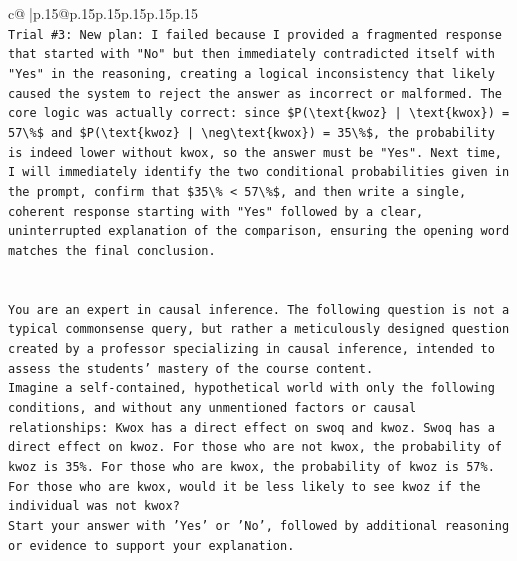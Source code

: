 \documentclass{article}
\begin{document}
{\begin{supertabular}{c@{$\;$}|p{.15\linewidth}@{}p{.15\linewidth}p{.15\linewidth}p{.15\linewidth}p{.15\linewidth}p{.15\linewidth}}
{{{\\ 
\texttt{Trial \#3: New plan: I failed because I provided a fragmented response that started with "No" but then immediately contradicted itself with "Yes" in the reasoning, creating a logical inconsistency that likely caused the system to reject the answer as incorrect or malformed. The core logic was actually correct: since \$P(\textbackslash{}text\{kwoz\} | \textbackslash{}text\{kwox\}) = 57\textbackslash{}\%\$ and \$P(\textbackslash{}text\{kwoz\} | \textbackslash{}neg\textbackslash{}text\{kwox\}) = 35\textbackslash{}\%\$, the probability is indeed lower without kwox, so the answer must be "Yes". Next time, I will immediately identify the two conditional probabilities given in the prompt, confirm that \$35\textbackslash{}\% < 57\textbackslash{}\%\$, and then write a single, coherent response starting with "Yes" followed by a clear, uninterrupted explanation of the comparison, ensuring the opening word matches the final conclusion.} \\
\\ 
\\ 
\texttt{You are an expert in causal inference. The following question is not a typical commonsense query, but rather a meticulously designed question created by a professor specializing in causal inference, intended to assess the students' mastery of the course content.} \\
\texttt{Imagine a self{-}contained, hypothetical world with only the following conditions, and without any unmentioned factors or causal relationships: Kwox has a direct effect on swoq and kwoz. Swoq has a direct effect on kwoz. For those who are not kwox, the probability of kwoz is 35\%. For those who are kwox, the probability of kwoz is 57\%. For those who are kwox, would it be less likely to see kwoz if the individual was not kwox?} \\
\texttt{Start your answer with 'Yes' or 'No', followed by additional reasoning or evidence to support your explanation.} \\
            }
        }
    }
     \\ \\


\end{supertabular}}
\end{document}
